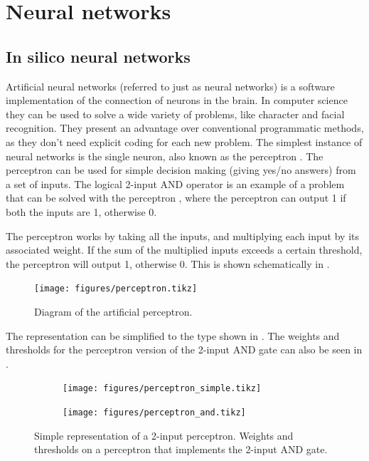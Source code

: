 \section{Neural networks}
\subsection{In silico neural networks}
Artificial neural networks (referred to just as neural networks) is a software implementation of the connection of neurons in the brain. In computer science they can be used to solve a wide variety of problems, like character and facial recognition. They present an advantage over conventional programmatic methods, as they don't need explicit coding for each new problem. The simplest instance of neural networks is the single neuron, also known as the perceptron \cite{Lippmann}. The perceptron can be used for simple decision making (giving yes/no answers) from a set of inputs. The logical 2-input AND operator is an example of a problem that can be solved with the perceptron \cite{ZhaoYanling}, where the perceptron can output 1 if both the inputs are 1, otherwise 0.

The perceptron works by taking all the inputs, and multiplying each input by its associated weight. If the sum of the multiplied inputs exceeds a certain threshold, the perceptron will output 1, otherwise 0. This is shown schematically in .

\begin{figure}[h]
\texttt{[image: figures/perceptron.tikz]}
\caption{Diagram of the artificial perceptron.}
\label{perceptron}
\end{figure}

The representation can be simplified to the type shown in . The weights and thresholds for the perceptron version of the 2-input AND gate can also be seen in .

\begin{figure}[h]
  \begin{subfigure}[t]{.49\textwidth}
    \texttt{[image: figures/perceptron\_simple.tikz]}
    \caption{}
    \label{perceptron_simple_a}
  \end{subfigure}
  \quad
  \begin{subfigure}[t]{.49\textwidth}
    \texttt{[image: figures/perceptron\_and.tikz]}
    \caption{}
    \label{perceptron_simple_b}
  \end{subfigure}
  \caption{ Simple representation of a 2-input perceptron.  Weights and thresholds on a perceptron that implements the 2-input AND gate.}
  \label{perceptron_simple}
\end{figure}

